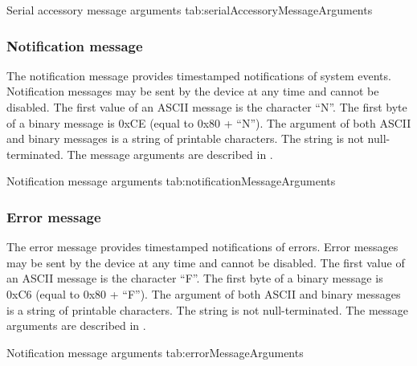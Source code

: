 \begingroup
    \def\tempArgumentA{Received serial accessory data}
    \dataMessageTable
    {Serial accessory message arguments}
    {tab:serialAccessoryMessageArguments}
\endgroup

\begingroup
    \def\tempNameA{Data}
    \def\tempValueA{0x61 0x62 0x63 0x31 0x32 0x33 0xF1 0xF2 0xF3}
    \def\tempAsciiFirst{S}
    \def\tempAsciiA{abc123???}
    \def\tempBinaryFirst{D3}
    \def\tempBinaryA{61 62 63 31 32 33 F1 F2 F3}
    \dataMessageExample
\endgroup

\subsubsection{Notification message}

The notification message provides timestamped notifications of system events.  Notification messages may be sent by the device at any time and cannot be disabled.  The first value of an \ac{ASCII} message is the character \enquote{N}.  The first byte of a binary message is 0xCE (equal to 0x80 + \enquote{N}).  The argument of both \ac{ASCII} and binary messages is a string of printable characters.  The string is not null-terminated.  The message arguments are described in .

\begingroup
    \def\tempArgumentA{Notification string}
    \dataMessageTable
    {Notification message arguments}
    {tab:notificationMessageArguments}
\endgroup

\begingroup
    \def\tempNameA{String}
    \def\tempValueA{This is a notification message.}
    \def\tempAsciiFirst{N}
    \def\tempAsciiA{This is a notification message.}
    \def\tempBinaryFirst{CE}
    \def\tempBinaryA{54 68 69 73 20 69 73 20 61 20 6E 6F 74 69 66 69 63 61 74 69 6F 6E 20 6D 65 73 73 61 67 65 2E}
    \dataMessageExample
\endgroup

\subsubsection{Error message}

The error message provides timestamped notifications of errors.  Error messages may be sent by the device at any time and cannot be disabled.  The first value of an \ac{ASCII} message is the character \enquote{F}.  The first byte of a binary message is 0xC6 (equal to 0x80 + \enquote{F}).  The argument of both \ac{ASCII} and binary messages is a string of printable characters.  The string is not null-terminated.  The message arguments are described in .

\begingroup
    \def\tempArgumentA{Error string}
    \dataMessageTable
    {Notification message arguments}
    {tab:errorMessageArguments}
\endgroup

\begingroup
    \def\tempNameA{String}
    \def\tempValueA{This is an error message.}
    \def\tempAsciiFirst{F}
    \def\tempAsciiA{This is an error message.}
    \def\tempBinaryFirst{C6}
    \def\tempBinaryA{54 68 69 73 20 69 73 20 61 6E 20 65 72 72 6F 72 20 6D 65 73 73 61 67 65 2E}
    \dataMessageExample
\endgroup
